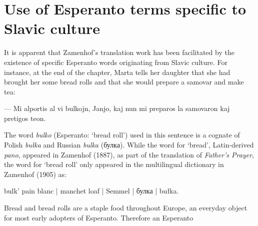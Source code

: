 \section{Use of Esperanto terms specific to Slavic culture}

It is apparent that Zamenhof's translation work has been facilitated by the existence of specific Esperanto words originating from Slavic culture.
For instance, at the end of the chapter, Marta tells her daughter that she had brought her some bread rolls and that she would prepare a samovar and make tea:

\begin{displayquote}
--- Mi alportis al vi bulkojn, Janjo, kaj nun mi preparos la samovaron kaj pretigos teon.
\end{displayquote}

The word \textit{bulko} (Esperanto: `bread roll') used in this sentence is a cognate of Polish \textit{bułka} and Russian \textit{bulka} ({\cyrfont булка}).
While the word for `bread', Latin-derived \textit{pano}, appeared in Zamenhof (1887), as part of the translation of \textit{Father's Prayer}, the word for `bread roll' only appeared in the multilingual dictionary in Zamenhof (1905) as:

\begin{displayquote}
bulk' pain blanc | manchet loaf | Semmel | булка | bułka.
\end{displayquote}

Bread and bread rolls are a staple food throughout Europe, an everyday object for most early adopters of Esperanto.
Therefore an Esperanto
